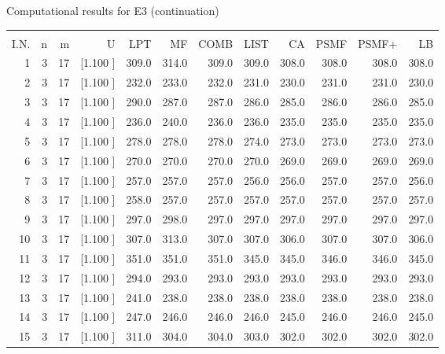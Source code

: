 \documentclass[12pt,a4paper]{article}
\begin{document}
\newpage
\begin{center}
 Computational results for E3 (continuation) {\tiny
\begin{tabular}{r r r r r r r r r r r r}\hline
    &   &   &          &        &        &        &        &        &        &        &       \\[-0.1in]
  I.N.  &  n  &  m  &  U  &  LPT  &  MF  &  COMB  &  LIST  &  CA  & PSMF &PSMF+ & LB \\[0.03in]
\hline
   1&  3& 17&[1.100     ]&   309.0&   314.0&   309.0&   309.0&   308.0&   308.0&   308.0&   308.0\\[-0.02in]
   2&  3& 17&[1.100     ]&   232.0&   233.0&   232.0&   231.0&   230.0&   231.0&   231.0&   230.0\\[-0.02in]
   3&  3& 17&[1.100     ]&   290.0&   287.0&   287.0&   286.0&   285.0&   286.0&   286.0&   285.0\\[-0.02in]
   4&  3& 17&[1.100     ]&   236.0&   240.0&   236.0&   236.0&   235.0&   235.0&   235.0&   235.0\\[-0.02in]
   5&  3& 17&[1.100     ]&   278.0&   278.0&   278.0&   274.0&   273.0&   273.0&   273.0&   273.0\\[-0.02in]
   6&  3& 17&[1.100     ]&   270.0&   270.0&   270.0&   270.0&   269.0&   269.0&   269.0&   269.0\\[-0.02in]
   7&  3& 17&[1.100     ]&   257.0&   257.0&   257.0&   256.0&   256.0&   257.0&   257.0&   256.0\\[-0.02in]
   8&  3& 17&[1.100     ]&   258.0&   257.0&   257.0&   257.0&   257.0&   257.0&   257.0&   257.0\\[-0.02in]
   9&  3& 17&[1.100     ]&   297.0&   298.0&   297.0&   297.0&   297.0&   297.0&   297.0&   297.0\\[-0.02in]
  10&  3& 17&[1.100     ]&   307.0&   313.0&   307.0&   307.0&   306.0&   307.0&   307.0&   306.0\\[-0.02in]
  11&  3& 17&[1.100     ]&   351.0&   351.0&   351.0&   345.0&   345.0&   346.0&   346.0&   345.0\\[-0.02in]
  12&  3& 17&[1.100     ]&   294.0&   293.0&   293.0&   293.0&   293.0&   293.0&   293.0&   293.0\\[-0.02in]
  13&  3& 17&[1.100     ]&   241.0&   238.0&   238.0&   238.0&   238.0&   238.0&   238.0&   238.0\\[-0.02in]
  14&  3& 17&[1.100     ]&   247.0&   246.0&   246.0&   246.0&   245.0&   246.0&   246.0&   245.0\\[-0.02in]
  15&  3& 17&[1.100     ]&   311.0&   304.0&   304.0&   303.0&   302.0&   302.0&   302.0&   302.0\\[-0.02in]

\end{tabular}}
\end{center}
\end{document}
